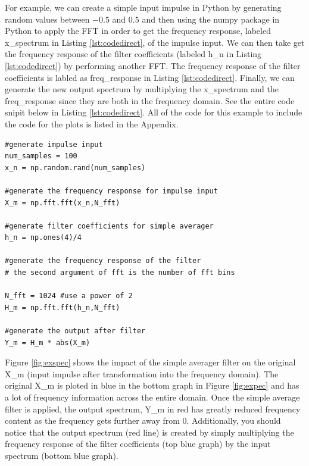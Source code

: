 For example, we can create a simple input impulse in Python by generating random values between $-0.5$ and $0.5$ and then using the numpy package in Python to apply the FFT in order to get the frequency response, labeled x\_spectrum in Listing \ref{lst:codedirect}, of the impulse input.  We can then take get the frequency response of the filter coefficients (labeled h\_n in Listing \ref{lst:codedirect}) by performing another FFT.  The frequency response of the filter coefficients is labled as freq\_response in Listing \ref{lst:codedirect}.  Finally, we can generate the new output spectrum by multiplying the x\_spectrum and the freq\_response since they are both in the frequency domain.  See the entire code snipit below in Listing \ref{lst:codedirect}.  All of the code for this example to include the code for the plots is listed in the Appendix.  

\lstset{language=Python}
\lstset{frame=lines}
\lstset{basicstyle=\footnotesize}
\begin{lstlisting}
#generate impulse input
num_samples = 100
x_n = np.random.rand(num_samples)

#generate the frequency response for impulse input
X_m = np.fft.fft(x_n,N_fft)

#generate filter coefficients for simple averager
h_n = np.ones(4)/4

#generate the frequency response of the filter
# the second argument of fft is the number of fft bins

N_fft = 1024 #use a power of 2
H_m = np.fft.fft(h_n,N_fft)

#generate the output after filter
Y_m = H_m * abs(X_m)
\end{lstlisting}

Figure \ref{fig:exspec} shows the impact of the simple averager filter on the original X\_m (input impulse after transformation into the frequency domain).  The original X\_m is ploted in blue in the bottom graph in Figure \ref{fig:expec} and has a lot of frequency information across the entire domain.  Once the simple average filter is applied, the output spectrum, Y\_m in red has greatly reduced frequency content as the frequency gets further away from 0.  Additionally, you should notice that the output spectrum (red line) is created by simply multiplying the frequency response of the filter coefficients (top blue graph) by the input spectrum (bottom blue graph).  

